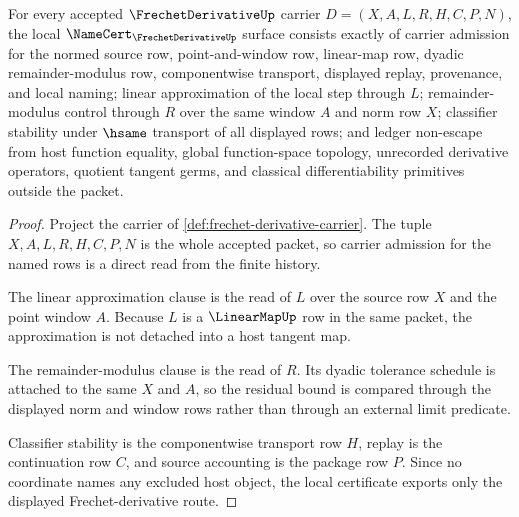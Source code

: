 \begin{theorem}
\label{thm:frechet-derivative-namecert-obligations}
For every accepted $\FrechetDerivativeUp$ carrier $D=(X,A,L,R,H,C,P,N)$, the local $\NameCert_{\FrechetDerivativeUp}$ surface consists exactly of carrier admission for the normed source row, point-and-window row, linear-map row, dyadic remainder-modulus row, componentwise transport, displayed replay, provenance, and local naming; linear approximation of the local step through $L$; remainder-modulus control through $R$ over the same window $A$ and norm row $X$; classifier stability under $\hsame$ transport of all displayed rows; and ledger non-escape from host function equality, global function-space topology, unrecorded derivative operators, quotient tangent germs, and classical differentiability primitives outside the packet.
\end{theorem}
\begin{proof}
Project the carrier of \autoref{def:frechet-derivative-carrier}. The tuple $X,A,L,R,H,C,P,N$ is the whole accepted packet, so carrier admission for the named rows is a direct read from the finite history.

The linear approximation clause is the read of $L$ over the source row $X$ and the point window $A$. Because $L$ is a $\LinearMapUp$ row in the same packet, the approximation is not detached into a host tangent map.

The remainder-modulus clause is the read of $R$. Its dyadic tolerance schedule is attached to the same $X$ and $A$, so the residual bound is compared through the displayed norm and window rows rather than through an external limit predicate.

Classifier stability is the componentwise transport row $H$, replay is the continuation row $C$, and source accounting is the package row $P$. Since no coordinate names any excluded host object, the local certificate exports only the displayed Frechet-derivative route.
\end{proof}

